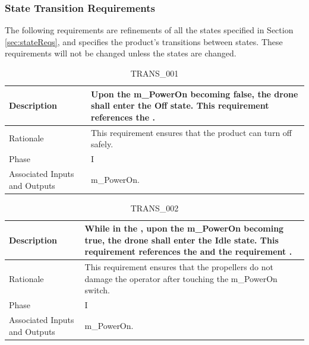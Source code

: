 \documentclass{article}
\begin{document}
\subsubsection{State Transition Requirements}
\label{transReqs}
The following requirements are refinements of all the states specified in Section \ref{sec:stateReqs}, and specifies the product's transitions between states. These requirements will not be changed unless the states are changed.

\begin{table}[!h]
\begin{center}
\caption {TRANS\_001} 
\label{TRANS_001}
\begin{tabular}{ | m{3cm} | m{11cm} | }
\hline
Description & Upon the m\_PowerOn becoming false, the drone shall enter the Off state. This requirement references the \nameref{Off State}. \\
\hline
Rationale & This requirement ensures that the product can turn off safely. \\
\hline
Phase & I \\
\hline
Associated Inputs and Outputs & m\_PowerOn. \\
\hline
\end{tabular}
\end{center}
\end{table}

\begin{table}[!h]
\begin{center}
\caption {TRANS\_002} 
\label{TRANS_002}
\begin{tabular}{ | m{3cm} | m{11cm} | }
\hline
Description & While in the \nameref{Off State}, upon the m\_PowerOn becoming true, the drone shall enter the Idle state. This requirement references the \nameref{Idle State} and the requirement \nameref{SAFE_005}. \\
\hline
Rationale & This requirement ensures that the propellers do not damage the operator after touching the m\_PowerOn switch.  \\
\hline
Phase & I \\
\hline
Associated Inputs and Outputs & m\_PowerOn. \\
\hline
\end{tabular}
\end{center}
\end{table}
\end{document}
